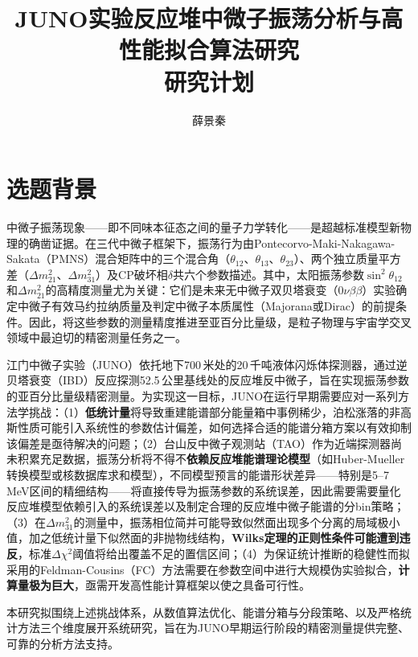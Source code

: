 \documentclass[a4paper, 12pt, UTF8]{ctexart}
\title{\textbf{JUNO实验反应堆中微子振荡分析与高性能拟合算法研究} \\ \vspace{0.3em} \Large 研究计划}
\author{薛景秦}
\date{}
\begin{document}
\maketitle
\thispagestyle{empty}

\section{选题背景}

中微子振荡现象——即不同味本征态之间的量子力学转化——是超越标准模型新物理的确凿证据。在三代中微子框架下，振荡行为由Pontecorvo-Maki-Nakagawa-Sakata（PMNS）混合矩阵中的三个混合角（$\theta_{12}$、$\theta_{13}$、$\theta_{23}$）、两个独立质量平方差（$\Delta m^2_{21}$、$\Delta m^2_{31}$）及CP破坏相$\delta$共六个参数描述。其中，太阳振荡参数$\sin^2\theta_{12}$和$\Delta m^2_{21}$的高精度测量尤为关键：它们是未来无中微子双贝塔衰变（$0\nu\beta\beta$）实验确定中微子有效马约拉纳质量及判定中微子本质属性（Majorana或Dirac）的前提条件。因此，将这些参数的测量精度推进至亚百分比量级，是粒子物理与宇宙学交叉领域中最迫切的精密测量任务之一。

江门中微子实验（JUNO）依托地下700\,米处的20\,千吨液体闪烁体探测器，通过逆贝塔衰变（IBD）反应探测52.5\,公里基线处的反应堆反中微子，旨在实现振荡参数的亚百分比量级精密测量。为实现这一目标，JUNO在运行早期需要应对一系列方法学挑战：（1）\textbf{低统计量}将导致重建能谱部分能量箱中事例稀少，泊松涨落的非高斯性质可能引入系统性的参数估计偏差，如何选择合适的能谱分箱方案以有效抑制该偏差是亟待解决的问题；（2）台山反中微子观测站（TAO）作为近端探测器尚未积累充足数据，振荡分析将不得不\textbf{依赖反应堆能谱理论模型}（如Huber-Mueller转换模型或核数据库求和模型），不同模型预言的能谱形状差异——特别是5--7\,MeV区间的精细结构——将直接传导为振荡参数的系统误差，因此需要需要量化反应堆模型依赖引入的系统误差以及制定合理的反应堆中微子能谱的分bin策略；（3）在$\Delta m^2_{31}$的测量中，振荡相位简并可能导致似然面出现多个分离的局域极小值，加之低统计量下似然面的非抛物线结构，\textbf{Wilks定理的正则性条件可能遭到违反}，标准$\Delta\chi^2$阈值将给出覆盖不足的置信区间；（4）为保证统计推断的稳健性而拟采用的Feldman-Cousins（FC）方法需要在参数空间中进行大规模伪实验拟合，\textbf{计算量极为巨大}，亟需开发高性能计算框架以使之具备可行性。

本研究拟围绕上述挑战体系，从数值算法优化、能谱分箱与分段策略、以及严格统计方法三个维度展开系统研究，旨在为JUNO早期运行阶段的精密测量提供完整、可靠的分析方法支持。

\end{document}
